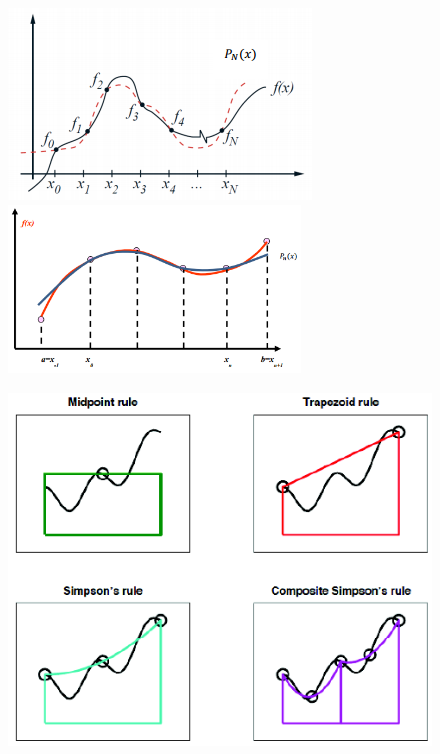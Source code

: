 \documentclass[12pt]{article}
\begin{document}
\begin{figure}
\begin{center}
  \includegraphics[height=2in,clip]{ClosedNewtonCotes}\\
  \includegraphics[height=1.75in,clip]{OpenNewtonCotes}\\
  \includegraphics[height=4in,clip]{QuadratureComparison}
\end{center}
\end{figure}

%
% 
\end{document}
